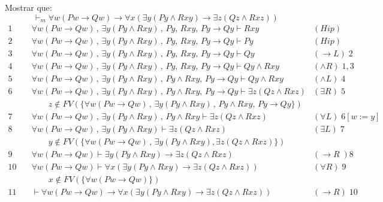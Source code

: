 \documentclass[11pt,letterpaper]{article}
\begin{document}
\bi
\item Mostrar que:
\[
\vdash_m \forall w (Pw \to Qw) 
\to \forall x (\exists y (P y \land Rxy) \to \exists z (Qz 
\land Rxz))
\]
\[
\begin{array}{rll}
1 \quad & \forall w (Pw \to Qw) \, , \, \exists y (P y \land Rxy) \, , 
\, P y,\, Rxy,\, P y \to Qy  \vdash Rxy  & (Hip)\\
2 \quad & \forall w (Pw \to Qw) \, , \, \exists y (P y \land Rxy) \, , 
\, P y ,\, Rxy,\, P y \to Qy  \vdash Py  & (Hip) \\
3 \quad & \forall w (Pw \to Qw) \, , \, \exists y (P y \land Rxy) \, , 
\, P y ,\, Rxy,\, P y \to Qy  \vdash Q y  & (\to L) \; 2\\
4 \quad & \forall w (Pw \to Qw) \, , \, \exists y (P y \land Rxy) \, , 
\, P y ,\, Rxy,\, P y \to Qy  \vdash Q y \land Rxy & (\land R) \; 1,3\\
5 \quad & \forall w (Pw \to Qw) \, , \, \exists y (P y \land Rxy) \, , 
\, P y \land Rxy ,\, P y \to Qy \vdash Qy \land Rxy  & (\land L) \; 4 \\
6 \quad &  \forall w (Pw \to Qw) \, , \, \exists y (P y \land Rxy)\, , 
\, P y \land Rxy,\, P y \to Qy  \vdash \exists z ( Qz \land Rxz) & (\exists R) 
\; 5\\
& \quad \quad z\notin FV(\{\forall w (Pw \to Qw) \, , \, \exists y (P y \land 
Rxy)\, , \, P y \land Rxy,\, P y \to Qy \}) & \\
7 \quad &  \forall w (Pw \to Qw) \, , \, \exists y (P y \land Rxy)\, , 
\, P y \land Rxy \vdash \exists z ( Qz \land Rxz) & (\forall L) \; 6 [w:=y]\\
8\quad &  \forall w (Pw \to Qw) \, , \, \exists y (P y \land Rxy) \vdash 
\exists z ( Qz \land Rxz)  & (\exists L) \; 7 \\
& \quad \quad y\notin FV(\{\forall w (Pw \to Qw) \, , \, \exists y (P y \land 
Rxy),\exists z ( Qz \land Rxz)\}) &\\
9\quad &  \forall w (Pw \to Qw)  \vdash 
\exists y (P y \land Rxy) \to \exists z ( Qz \land Rxz)  & (\to R \; ) 8 \\
10\quad &  \forall w (Pw \to Qw)  \vdash 
\forall x (\exists y (P y \land Rxy) \to \exists z ( Qz \land Rxz)) 
    & (\forall R)\; 9 \\
& \quad \quad x\notin FV(\{\forall w (Pw \to Qw)\})\\
11\quad & \vdash 
\forall w (Pw \to Qw) \to \forall x (\exists y (P y \land Rxy) 
\to \exists z ( Qz \land Rxz)) & (\to R) \; 10\\
\end{array}
\]
\end{document}
